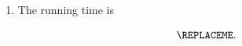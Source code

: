 \begin{enumerate}[label=(\alph*)]
\item


  The running time is

  \begin{blue}
    \[
      \REPLACEME.
    \]
  \end{blue}
  
\end{enumerate}


